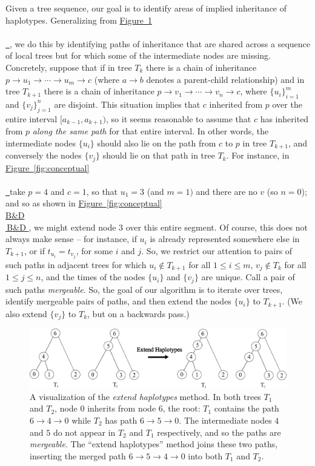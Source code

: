 \documentclass[10pt,twoside,lineno]{gsajnl}
\newcommand*{\figref}[2][]{%
	\hyperref[{#2}]{%
		Figure~\ref*{#2}%
		\ifx\\#1\\%
		\else
		\,#1%
		\fi
	}%
}
\begin{document}
Given a tree sequence, our goal is to
identify areas of implied inheritance of haplotypes.
Generalizing from \figref{fig:extending_diagram},
we do this by identifying paths of inheritance that are shared across a sequence of local trees
but for which some of the intermediate nodes are missing.
Concretely, suppose that 
if in tree $T_k$ there is a chain of inheritance
$p \to u_1 \to \cdots \to u_m \to c$
(where $a \to b$ denotes a parent-child relationship)
and in tree $T_{k+1}$ there is a chain of inheritance
$p \to v_1 \to \cdots \to v_n \to c$,
where $\{u_i\}_{i=1}^m$ and $\{v_j\}_{j=1}^n$ are disjoint.
This situation implies that $c$ inherited from $p$ over the entire interval $[a_{k-1}, a_{k+1})$,
so it seems reasonable to assume that $c$ has inherited from $p$ \emph{along the same path} for that entire interval.
In other words, the intermediate nodes $\{u_i\}$ should also lie on the path from $c$ to $p$ in tree $T_{k+1}$,
and conversely the nodes $\{v_j\}$ should lie on that path in tree $T_k$.
For instance, in \figref{fig:conceptual} take $p=4$ and $c=1$,
so that $u_1=3$ (and $m=1)$ and there are no $v$ (so $n=0$); 
and so as shown in \figref[B\&D]{fig:conceptual},
we might extend node 3 over this entire segment.
Of course, this does not always make sense --
for instance, if $u_i$ is already represented somewhere else in $T_{k+1}$,
or if $t_{u_i} = t_{v_j}$, for some $i$ and $j$.
So, we restrict our attention to pairs of such paths in adjacent trees
for which
$u_i \notin T_{k+1}$ for all $1 \le i \le m$,
$v_j \notin T_k$ for all $1 \le j \le n$,
and the times of the nodes $\{u_i\}$ and $\{v_j\}$ are unique.
Call a pair of such paths \emph{mergeable}.
So, the goal of our algorithm is to iterate over trees,
identify mergeable pairs of paths,
and then extend the nodes $\{u_i\}$ to $T_{k+1}$.
(We also extend $\{v_j\}$ to $T_k$, but on a backwards pass.)

\begin{figure}[!ht]
\begin{center}
	\includegraphics[width=5in]{figures/edge_extend_method.pdf}
\end{center}
\caption{A visualization of the \textit{extend haplotypes} method.
    In both trees $T_1$ and $T_2$,
    node 0 inherits from node 6, the root:
    $T_1$ contains the path $6\to 4\to 0$ while $T_2$ has path $6\to 5\to 0$.
    The intermediate nodes $4$ and $5$ do not appear in $T_2$ and $T_1$ respectively, and so the paths are \textit{mergeable}.
    The ``extend haplotypes'' method joins these two paths,
    inserting the merged path $6\to 5\to 4\to 0$ into both $T_1$ and $T_2$.
    \label{fig:extending_diagram}
}
\end{figure}
\end{document}
